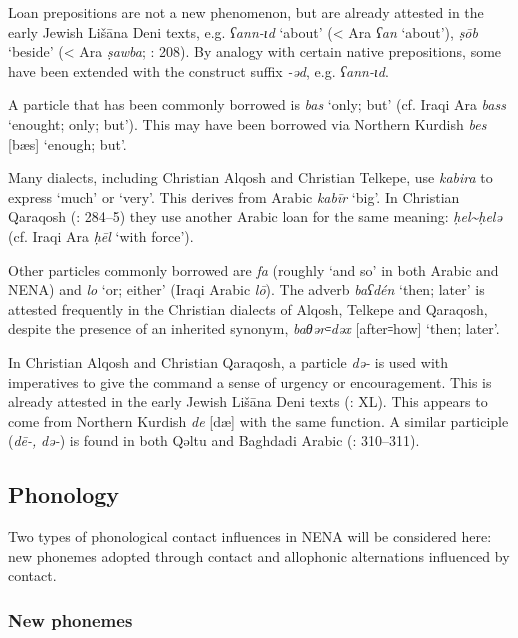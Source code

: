 \documentclass[output=paper]{langsci/langscibook}
\begin{document}
Loan prepositions are not a new phenomenon, but are already attested in the early Jewish Lišāna Deni texts, e.g. \textit{ʕann\nobreakdash-ɩd} ‘about’ (< Ara \textit{ʕan} ‘about’), \textit{ṣōb} ‘beside’ (< Ara \textit{ṣawba}; \citealt{Sabar1984}: 208). By analogy with certain native prepositions, some have been extended with the construct suffix \textit{\nobreakdash-əd}, e.g. \textit{ʕann\nobreakdash-ɩd}.

A particle that has been commonly borrowed is \textit{bas} ‘only; but’ (cf. Iraqi Ara \textit{bass} ‘enought; only; but’). This may have been borrowed via Northern Kurdish \textit{bes} [bæs] ‘enough; but’.

Many dialects, including Christian Alqosh and Christian Telkepe, use \textit{kabira} to express ‘much’ or ‘very’. This derives from Arabic \textit{kabīr} ‘big’. In Christian Qaraqosh (\citealt{Khan2002}: 284–5) they use another Arabic loan for the same meaning: \textit{ḥel{\textasciitilde}ḥelə} (cf. Iraqi Ara \textit{ḥēl} ‘with force’).

Other particles commonly borrowed are \textit{fa} (roughly ‘and so’ in both Arabic and NENA) and \textit{lo} ‘or; either’ (Iraqi Arabic \textit{lō}). The adverb \textit{baʕdén} ‘then; later’ is attested frequently in the Christian dialects of Alqosh, Telkepe and Qaraqosh, despite the presence of an inherited synonym, \textit{baθər꞊dəx} [after꞊how] ‘then; later’.

In Christian Alqosh and Christian Qaraqosh, a particle \textit{də\nobreakdash-} is used with imperatives to give the command a sense of urgency or encouragement. This is already attested in the early Jewish Lišāna Deni texts (\citealt{Sabar1976}: XL). This appears to come from Northern Kurdish \textit{de} [dæ] with the same function. A similar participle (\textit{dē\nobreakdash-,} \textit{də\nobreakdash-}) is found in both Qəltu and Baghdadi Arabic (\citealt{Jastrow1978}: 310–311).

\subsection{Phonology}

Two types of phonological contact influences in NENA will be considered here: new phonemes adopted through contact and allophonic alternations influenced by contact.

\subsubsection{New phonemes}
\end{document}
